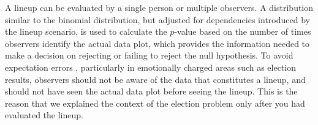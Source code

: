 \documentclass[10pt]{article}\usepackage[]{graphicx}\usepackage[]{color}
\begin{document}
A lineup can be evaluated by a single person or multiple observers. A distribution similar to the binomial distribution, but adjusted for dependencies introduced by the lineup scenario, is used to calculate the $p$-value based on the number of times observers identify the actual data plot, which provides the information needed to make a decision on rejecting or failing to reject the null hypothesis.  To avoid expectation errors \citep{meilgaard}, particularly in emotionally charged areas such as election results, observers should not be aware of the data that constitutes a lineup, and should not have seen the actual data plot before seeing the lineup. This is the reason that we explained the context of the election problem only after you had evaluated the lineup.%
\end{document}
